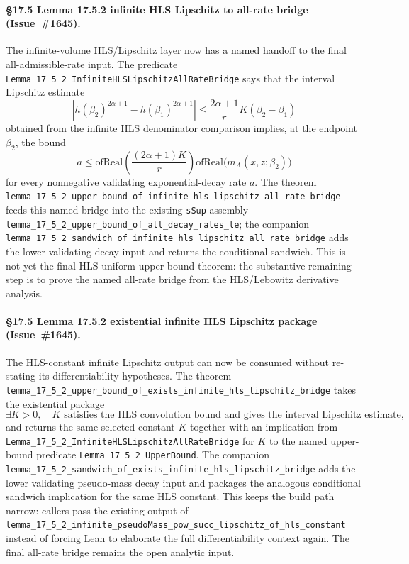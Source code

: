 \documentclass[a4paper,11pt]{article}
\begin{document}
\paragraph{\S17.5 Lemma 17.5.2 infinite HLS Lipschitz to all-rate bridge
(Issue~\#1645).} The infinite-volume HLS/Lipschitz layer now has a named
handoff to the final all-admissible-rate input.  The predicate
\texttt{Lemma\_17\_5\_2\_InfiniteHLSLipschitzAllRateBridge} says that the
interval Lipschitz estimate
\[
  |h(\beta_2)^{2\alpha+1}-h(\beta_1)^{2\alpha+1}|
  \le \frac{2\alpha+1}{r}K(\beta_2-\beta_1)
\]
obtained from the infinite HLS denominator comparison implies, at the endpoint
\(\beta_2\), the bound
\[
  a \le
  \mathrm{ofReal}\!\left(\frac{(2\alpha+1)K}{r}\right)
  \mathrm{ofReal}\bigl(m^-_{\Lambda}(x,z;\beta_2)\bigr)
\]
for every nonnegative validating exponential-decay rate \(a\).  The theorem
\texttt{lemma\_17\_5\_2\_upper\_bound\_of\_infinite\_hls\_lipschitz\_all\_rate\_bridge}
feeds this named bridge into the existing \texttt{sSup} assembly
\texttt{lemma\_17\_5\_2\_upper\_bound\_of\_all\_decay\_rates\_le}; the
companion
\texttt{lemma\_17\_5\_2\_sandwich\_of\_infinite\_hls\_lipschitz\_all\_rate\_bridge}
adds the lower validating-decay input and returns the conditional sandwich.
This is not yet the final HLS-uniform upper-bound theorem: the substantive
remaining step is to prove the named all-rate bridge from the
HLS/Lebowitz derivative analysis.

\paragraph{\S17.5 Lemma 17.5.2 existential infinite HLS Lipschitz package
(Issue~\#1645).} The HLS-constant infinite Lipschitz output can now be consumed
without re-stating its differentiability hypotheses.  The theorem
\texttt{lemma\_17\_5\_2\_upper\_bound\_of\_exists\_infinite\_hls\_lipschitz\_bridge}
takes the existential package
\[
  \exists K>0,\quad
  K \text{ satisfies the HLS convolution bound and gives the interval
  Lipschitz estimate,}
\]
and returns the same selected constant \(K\) together with an implication from
\texttt{Lemma\_17\_5\_2\_InfiniteHLSLipschitzAllRateBridge} for \(K\) to the
named upper-bound predicate \texttt{Lemma\_17\_5\_2\_UpperBound}.  The companion
\texttt{lemma\_17\_5\_2\_sandwich\_of\_exists\_infinite\_hls\_lipschitz\_bridge}
adds the lower validating pseudo-mass decay input and packages the analogous
conditional sandwich implication for the same HLS constant.  This keeps the
build path narrow: callers pass the existing output of
\texttt{lemma\_17\_5\_2\_infinite\_pseudoMass\_pow\_succ\_lipschitz\_of\_hls\_constant}
instead of forcing Lean to elaborate the full differentiability context again.
The final all-rate bridge remains the open analytic input.
\end{document}
